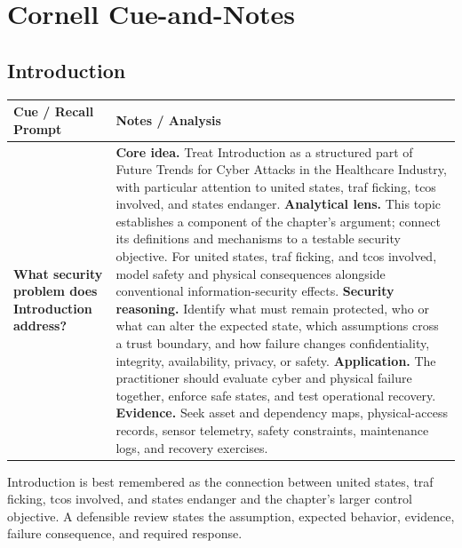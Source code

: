 \documentclass[11pt]{article}
\newcommand{\CornellHeader}{%
\rowcolor{Navy}\color{white}\bfseries Cue / Recall Prompt & \color{white}\bfseries Notes / Analysis\\\hline}
\newcommand{\CornellRow}[2]{%
\cellcolor{CueGray}\RaggedRight\textbf{#1} & \RaggedRight #2\\\hline}
\begin{document}
\section*{Cornell Cue-and-Notes}
\subsection*{Introduction}
\begin{longtable}{>{\RaggedRight\arraybackslash}p{}|>{\RaggedRight\arraybackslash}p{}}
\CornellHeader
\CornellRow{What security problem does Introduction address?}{\textbf{Core idea.} Treat Introduction as a structured part of Future Trends for Cyber Attacks in the Healthcare Industry, with particular attention to united states, traf ficking, tcos involved, and states endanger. \textbf{Analytical lens.} This topic establishes a component of the chapter's argument; connect its definitions and mechanisms to a testable security objective. For united states, traf ficking, and tcos involved, model safety and physical consequences alongside conventional information-security effects. \textbf{Security reasoning.} Identify what must remain protected, who or what can alter the expected state, which assumptions cross a trust boundary, and how failure changes confidentiality, integrity, availability, privacy, or safety. \textbf{Application.} The practitioner should evaluate cyber and physical failure together, enforce safe states, and test operational recovery. \textbf{Evidence.} Seek asset and dependency maps, physical-access records, sensor telemetry, safety constraints, maintenance logs, and recovery exercises.}
\end{longtable}
\begin{topicsummary}
Introduction is best remembered as the connection between united states, traf ficking, tcos involved, and states endanger and the chapter's larger control objective. A defensible review states the assumption, expected behavior, evidence, failure consequence, and required response.
\end{topicsummary}
\end{document}
